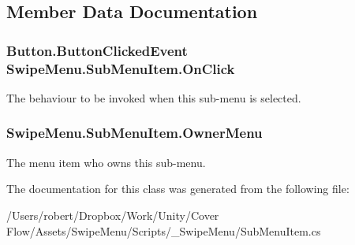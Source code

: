 \subsection{Member Data Documentation}
\hypertarget{class_swipe_menu_1_1_sub_menu_item_aa295509f434ae03d0f8e4c2e11a6e998}{}
\subsubsection[{On\+Click}]{\setlength{\rightskip}{0pt plus 5cm}Button.\+Button\+Clicked\+Event Swipe\+Menu.\+Sub\+Menu\+Item.\+On\+Click}\label{class_swipe_menu_1_1_sub_menu_item_aa295509f434ae03d0f8e4c2e11a6e998}


The behaviour to be invoked when this sub-\/menu is selected. 

\hypertarget{class_swipe_menu_1_1_sub_menu_item_a2f73caa38f0e82a3fe5505d43d759155}{}
\subsubsection[{Owner\+Menu}]{ Swipe\+Menu.\+Sub\+Menu\+Item.\+Owner\+Menu}\label{class_swipe_menu_1_1_sub_menu_item_a2f73caa38f0e82a3fe5505d43d759155}


The menu item who owns this sub-\/menu. 



The documentation for this class was generated from the following file\+:\begin{DoxyCompactItemize}
\item 
/\+Users/robert/\+Dropbox/\+Work/\+Unity/\+Cover Flow/\+Assets/\+Swipe\+Menu/\+Scripts/\+\_\+\+Swipe\+Menu/Sub\+Menu\+Item.\+cs\end{DoxyCompactItemize}
